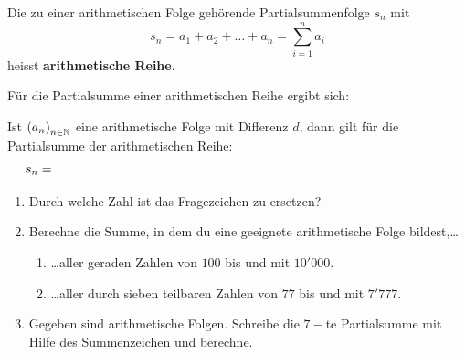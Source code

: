\documentclass[11pt,oneside]{article}
\begin{document}
	\begin{definition}
		Die zu einer arithmetischen Folge gehörende Partialsummenfolge $s_n$ mit \[s_n=a_1+a_2+\ldots+a_n=\sum_{i=1}^n a_i\] heisst \textbf{arithmetische Reihe}.
	\end{definition}
	Für die Partialsumme einer arithmetischen Reihe ergibt sich:\vspace{5pt}\newline{}
	\begin{satz}
		Ist $\left(a_n\right)_{n\in\mathbb{N}}$ eine arithmetische Folge mit Differenz $d$, dann gilt für die Partialsumme der arithmetischen Reihe: \[s_n=\hspace*{11cm}\]
	\end{satz}
	\begin{aufgabe}
		\begin{enumerate}
			\item Durch welche Zahl ist das Fragezeichen zu ersetzen? %
			\item Berechne die Summe, in dem du eine geeignete arithmetische Folge bildest,\ldots %
			\begin{enumerate}[label=\alph*)]
				\item \ldots aller geraden Zahlen von $100$ bis und mit $10'000$.
				\item \ldots aller durch sieben teilbaren Zahlen von $77$ bis und mit $7'777$.
			\end{enumerate}
			\item Gegeben sind arithmetische Folgen. Schreibe die $7-$te Partialsumme mit Hilfe des Summenzeichen und berechne. %

\end{enumerate}
\end{aufgabe}
\end{document}
